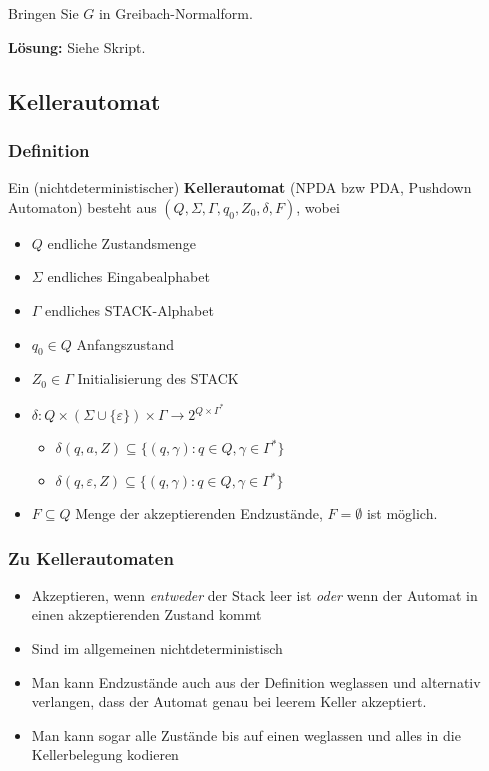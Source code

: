 \documentclass{beamer}
\begin{document}
{\begin{frame}
Bringen Sie $G$ in Greibach-Normalform.

\textbf{Lösung:} Siehe Skript.
\end{frame}

\subsection{Kellerautomat}
\begin{frame}
\frametitle{Definition}
Ein (nichtdeterministischer) \textbf{Kellerautomat} (NPDA bzw PDA, Pushdown Automaton) besteht aus $(Q, \Sigma, \Gamma, q_0, Z_0,\delta, F)$, wobei
\begin{itemize}
\item $Q$ endliche Zustandsmenge
\item $\Sigma$ endliches Eingabealphabet
\item $\Gamma$ endliches STACK-Alphabet
\item $q_0 \in Q$ Anfangszustand
\item $Z_0 \in \Gamma$ Initialisierung des STACK
\item $\delta : Q \times ( \Sigma \cup \{\varepsilon\}) \times \Gamma \rightarrow 2^{Q \times \Gamma^*}$
\begin{itemize}
\item $\delta(q, a, Z) \subseteq \{(q,\gamma) : q \in Q, \gamma \in \Gamma^*\}$
\item $\delta(q, \varepsilon, Z) \subseteq \{(q,\gamma) : q \in Q, \gamma \in \Gamma^*\}$
\end{itemize}
\item $F \subseteq Q$ Menge der akzeptierenden Endzustände, $F=\emptyset$ ist möglich.
\end{itemize}
\end{frame}

\begin{frame}
\frametitle{Zu Kellerautomaten}
\begin{itemize}
\item Akzeptieren, wenn \emph{entweder} der Stack leer ist \emph{oder} wenn der Automat in einen akzeptierenden Zustand kommt
\item Sind im allgemeinen nichtdeterministisch
\item Man kann Endzustände auch aus der Definition weglassen und alternativ verlangen, dass der Automat genau bei leerem Keller akzeptiert.
\item Man kann sogar alle Zustände bis auf einen weglassen und alles in die Kellerbelegung kodieren
\end{itemize}
\end{frame}

}
\end{document}
